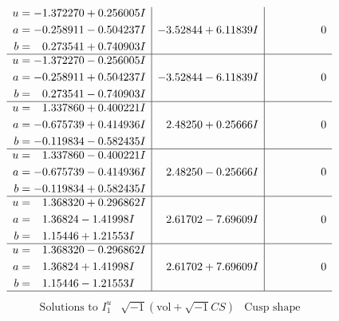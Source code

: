 \documentclass[1p]{elsarticle_modified}
\theoremstyle{definition}
\newcommand{\I}{\sqrt{-1}}
\begin{document}
$$\begin{array}{c|c|c}
\begin{aligned}
u &= -1.372270 + 0.256005 I \\
a &= -0.258911 - 0.504237 I \\
b &= \phantom{-}0.273541 + 0.740903 I\end{aligned}
 & -3.52844 + 6.11839 I & \phantom{-0.000000 } 0 \\ \hline\begin{aligned}
u &= -1.372270 - 0.256005 I \\
a &= -0.258911 + 0.504237 I \\
b &= \phantom{-}0.273541 - 0.740903 I\end{aligned}
 & -3.52844 - 6.11839 I & \phantom{-0.000000 } 0 \\ \hline\begin{aligned}
u &= \phantom{-}1.337860 + 0.400221 I \\
a &= -0.675739 + 0.414936 I \\
b &= -0.119834 - 0.582435 I\end{aligned}
 & \phantom{-}2.48250 + 0.25666 I & \phantom{-0.000000 } 0 \\ \hline\begin{aligned}
u &= \phantom{-}1.337860 - 0.400221 I \\
a &= -0.675739 - 0.414936 I \\
b &= -0.119834 + 0.582435 I\end{aligned}
 & \phantom{-}2.48250 - 0.25666 I & \phantom{-0.000000 } 0 \\ \hline\begin{aligned}
u &= \phantom{-}1.368320 + 0.296862 I \\
a &= \phantom{-}1.36824 - 1.41998 I \\
b &= \phantom{-}1.15446 + 1.21553 I\end{aligned}
 & \phantom{-}2.61702 - 7.69609 I & \phantom{-0.000000 } 0 \\ \hline\begin{aligned}
u &= \phantom{-}1.368320 - 0.296862 I \\
a &= \phantom{-}1.36824 + 1.41998 I \\
b &= \phantom{-}1.15446 - 1.21553 I\end{aligned}
 & \phantom{-}2.61702 + 7.69609 I & \phantom{-0.000000 } 0\\
 \hline 
 \end{array}$$\newpage$$\begin{array}{c|c|c}  
\text{Solutions to }I^u_{1}& \I (\text{vol} + \sqrt{-1}CS) & \text{Cusp shape}\\
 \hline 
\begin{aligned}

\end{aligned}
\end{array}$$
\end{document}
